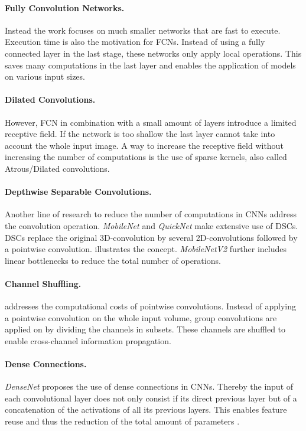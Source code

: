 \paragraph{Fully Convolution Networks.}

Instead the work focuses on much smaller networks that are fast to execute. Execution time is also the motivation for \acp{FCN}. Instead of using a fully connected layer in the last stage, these networks only apply local operations. This saves many computations in the last layer and enables the application of models on various input sizes.

\paragraph{Dilated Convolutions.}

However, \ac{FCN} in combination with a small amount of layers introduce a limited receptive field. If the network is too shallow the last layer cannot take into account the whole input image. A way to increase the receptive field without increasing the number of computations is the use of sparse kernels, also called Atrous/Dilated convolutions. 

\paragraph{Depthwise Separable Convolutions.}

Another line of research to reduce the number of computations in \acp{CNN} address the convolution operation. \textit{MobileNet} \cite{Howard2017} and \textit{QuickNet} \cite{Ghosh2017} make extensive use of \acp{DSC}. \acp{DSC} replace the original 3D-convolution by several 2D-convolutions followed by a pointwise convolution.  illustrates the concept. \textit{MobileNetV2} \cite{Sandler2018} further includes linear bottlenecks to reduce the total number of operations.

\paragraph{Channel Shuffling.}

\cite{Zhang2017a} addresses the computational costs of pointwise convolutions. Instead of applying a pointwise convolution on the whole input volume, group convolutions are applied on by dividing the channels in subsets. These channels are shuffled to enable cross-channel information propagation. 

\paragraph{Dense Connections.}
\textit{DenseNet} \cite{Huang2016} proposes the use of dense connections in \acp{CNN}. Thereby the input of each convolutional layer does not only consist if its direct previous layer but of a concatenation of the activations of all its previous layers. This enables feature reuse  and thus the reduction of the total amount of parameters .

